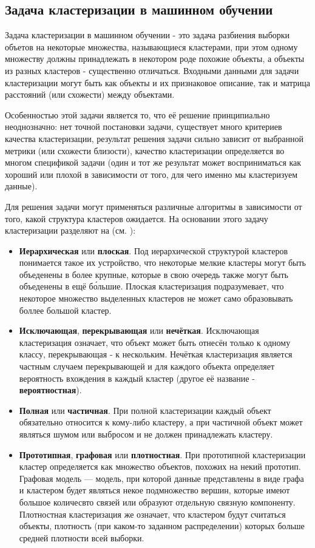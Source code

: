 \documentclass[12pt,fleqn]{article}
\begin{document}
\subsection{Задача кластеризации в машинном обучении}

Задача кластеризации в машинном обучении - это задача разбиения выборки объетов на некоторые множества, называющиеся кластерами, при этом одному множеству должны принадлежать в некотором роде похожие объекты, а объекты из разных кластеров - существенно отличаться. Входными данными для задачи кластеризации могут быть как объекты и их признаковое описание, так и матрица расстояний (или схожести) между объектами.

Особенностью этой задачи является то, что её решение принципиально неоднозначно: нет точной постановки задачи, существует много критериев качества кластеризации, результат решения задачи сильно зависит от выбранной метрики (или схожести близости), качество кластеризации определяется во многом спецификой задачи (один и тот же результат может восприниматься как хороший или плохой в зависимости от того, для чего именно мы кластеризуем данные).


Для решения задачи могут применяться различные алгоритмы в зависимости от того, какой структура кластеров ожидается. На основании этого задачу кластеризации разделяют на (см. \cite{cluster_class}):
\begin{itemize}
\item \textbf{Иерархическая} или \textbf{плоская}. Под иерархической  структурой кластеров понимается такое их устройство, что некоторые мелкие кластеры могут быть объеденены в более крупные, которые в свою очередь также могут быть объеденены в ещё б\'{о}льшие. Плоская кластеризация подразумевает, что некоторое множество выделенных кластеров не может само образовывать боллее большой кластер.
\item \textbf{Исключающая}, \textbf{перекрывающая} или \textbf{нечёткая}. Исключающая кластеризация означает, что объект может быть отнесён только к одному классу, перекрывающая - к нескольким. Нечёткая кластеризация является частным случаем перекрывающей и для каждого объекта определяет вероятность вхождения в каждый кластер (другое её название - \textbf{вероятностная}).
\item \textbf{Полная} или \textbf{частичная}. При полной кластеризации каждый объект обязательно относится к кому-либо кластеру, а при частичной объект может являться шумом или выбросом и не должен принадлежать кластеру.
\item \textbf{Прототипная}, \textbf{графовая} или \textbf{плотностная}. При прототипной кластеризации кластер определяется как множество объектов, похожих на некий прототип. Графовая модель --- модель, при которой данные представлены в виде графа и кластером будет являться некое подмножество вершин, которые имеют большое количесвто связей или образуют отдельную связную компоненту. Плотностная кластеризация же означает, что кластером будут считаться объекты, плотность (при каком-то заданном распределении) которых больше средней плотности всей выборки.
\end{itemize}
\end{document}
